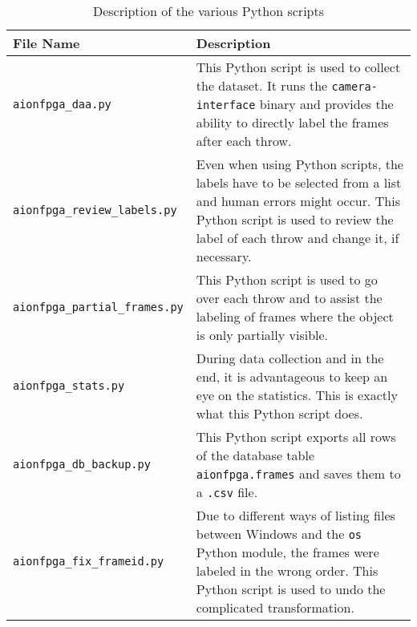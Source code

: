 \begin{table}[hb]
  \caption{Description of the various Python scripts}
  \label{tab:python_scripts}
  \centering
  \begin{tabular}{lp{9cm}}
    \toprule
    \textbf{File Name} & \textbf{Description} \\
    \midrule
    \texttt{aionfpga\_daa.py} & This Python script is used to collect the dataset. It runs the \texttt{camera-interface} binary and provides the ability to directly label the frames after each throw. \\
    \midrule
    \texttt{aionfpga\_review\_labels.py} & Even when using Python scripts, the labels have to be selected from a list and human errors might occur. This Python script is used to review the label of each throw and change it, if necessary. \\
    \midrule
    \texttt{aionfpga\_partial\_frames.py} & This Python script is used to go over each throw and to assist the labeling of frames where the object is only partially visible. \\
    \midrule
    \texttt{aionfpga\_stats.py} & During data collection and in the end, it is advantageous to keep an eye on the statistics. This is exactly what this Python script does. \\
    \midrule
    \texttt{aionfpga\_db\_backup.py} & This Python script exports all rows of the database table \texttt{aionfpga.frames} and saves them to a \texttt{.csv} file. \\
    \midrule
    \texttt{aionfpga\_fix\_frameid.py} & Due to different ways of listing files between Windows and the \texttt{os} Python module, the frames were labeled in the wrong order. This Python script is used to undo the complicated transformation. \\
    \bottomrule
  \end{tabular}
\end{table}
